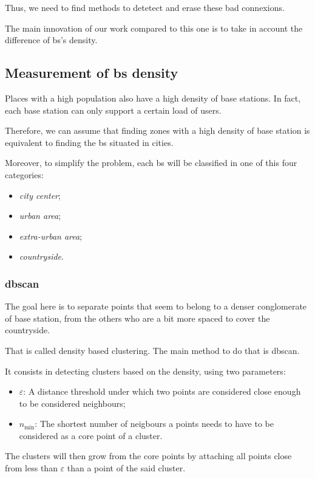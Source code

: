 \documentclass[lettersize,journal,english]{IEEEtran}
\begin{document}
Thus, we need to find methods to detetect and erase these bad connexions.

The main innovation of our work compared to this one \cite{art_del_paq} is to take in account the difference of \acrshort{bs}'s density.

\subsection{Measurement of \acrshort{bs} density}
Places with a high population also have a high density of base stations. In fact, each base station can only support a certain
load of users.

Therefore, we can assume that finding zones with a high density of base station is equivalent to finding the \acrshort{bs} 
situated in \og cities\fg{}.

Moreover, to simplify the problem, each \acrshort{bs} will be classified in one of this four categories:
\begin{itemize}
    \item \emph{city center};
    \item \emph{urban area};
    \item \emph{extra-urban area};
    \item \emph{countryside}.
\end{itemize}

\subsubsection{\acrshort{dbscan}}
The goal here is to separate points that seem to belong to a denser conglomerate of base station, from the others who are a bit more spaced
to cover the countryside.

That is called density based clustering. The main method to do that is \acrshort{dbscan}.

It consists in detecting clusters based on the density, using two parameters:

\begin{itemize}
    \item \emph{$\varepsilon$}: A distance threshold under which two points are considered close enough to be considered neighbours;   
    \item \emph{$n_{\text{min}}$}: The shortest number of neigbours a points needs to have to be considered as a core point of a cluster.
\end{itemize}

The clusters will then \og grow\fg{} from the core points by attaching all points close from less than \emph{$\varepsilon$} than a point of the said 
cluster.
\end{document}

